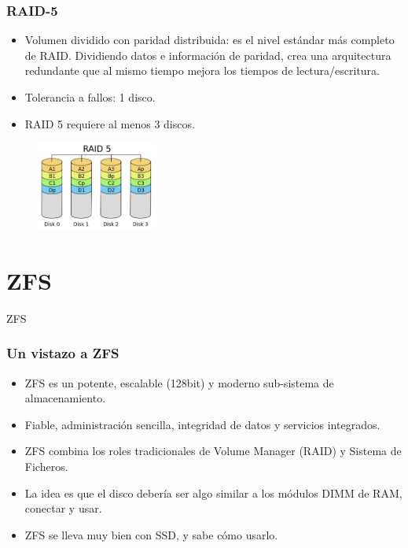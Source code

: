 \documentclass{beamer}
\begin{document}
\begin{frame}
  \frametitle{RAID-5}

  \begin{itemize}
    \item Volumen dividido con paridad distribuida: es el nivel estándar más completo de RAID. Dividiendo datos e información de paridad, crea una arquitectura redundante que al mismo tiempo mejora los tiempos de lectura/escritura.
    \item Tolerancia a fallos: 1 disco.
    \item RAID 5 requiere al menos 3 discos.
  \end{itemize}

\begin{figure}[h]
\begin{center}
  \includegraphics[width=4cm]{figs/RAID_5.png}
\end{center}
\end{figure}

\end{frame}


\section{ZFS}

\begin{frame}
  \begin{center}
    \Huge{ZFS}
  \end{center}
\end{frame}

\begin{frame}
  \frametitle{Un vistazo a ZFS}
  \begin{itemize}
    \item ZFS es un potente, escalable (128bit) y moderno sub-sistema de almacenamiento.
    \item Fiable, administración sencilla, integridad de datos y servicios integrados.
    \item ZFS combina los roles tradicionales de Volume Manager (RAID) y Sistema de Ficheros.
    \item La idea es que el disco debería ser algo similar a los módulos DIMM de RAM, conectar y usar.
    \item ZFS se lleva muy bien con SSD, y sabe cómo usarlo.
    
  \end{itemize}
\end{frame}
\end{document}

